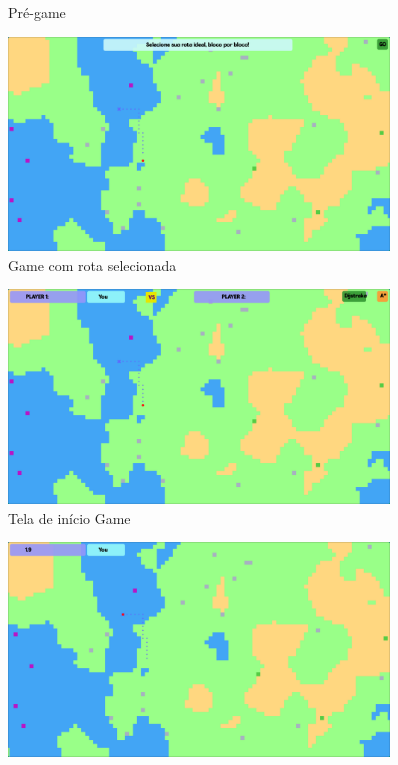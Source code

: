 \documentclass[
	12pt,				%
	oneside,			%
	a4paper,			%
	english,			%
	brazil,				%
	]{abntex2}
\begin{document}
{\begin{figure}[H]
\caption{Pré-game}
\label{imagem 3}
\end{figure}
\begin{figure}[H]
\centering
\includegraphics[width=0.9\textwidth]{imgs/pre-game-2.png}
\caption{Game com rota selecionada}
\label{imagem 4}
\end{figure}
\begin{figure}[H]
\centering
\includegraphics[width=0.9\textwidth]{imgs/inicio-game.png}
\caption{Tela de início Game}
\label{imagem 5}
\end{figure}
\begin{figure}[H]
\centering
\includegraphics[width=0.9\textwidth]{imgs/player.png}

\end{figure}}
\end{document}
